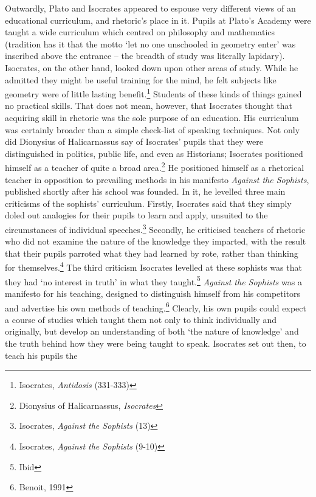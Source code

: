 \begin{multicols}{2}
Outwardly, Plato and Isocrates appeared to espouse very different views
of an educational curriculum, and rhetoric's place in it. Pupils at
Plato's Academy were taught a wide curriculum which centred on
philosophy and mathematics (tradition has it that the motto `let no one
unschooled in geometry enter' was inscribed above the entrance -- the
breadth of study was literally lapidary). Isocrates, on the other hand,
looked down upon other areas of study. While he admitted they might be
useful training for the mind, he felt subjects like geometry were of
little lasting benefit.\footnote{\textsuperscript{} Isocrates,
	\emph{Antidosis} (331-333)} Students of these kinds of things gained
no practical skills. That does not mean, however, that Isocrates thought
that acquiring skill in rhetoric was the sole purpose of an education.
His curriculum was certainly broader than a simple check-list of
speaking techniques. Not only did Dionysius of Halicarnassus say of
Isocrates' pupils that they were distinguished in politics, public life,
and even as Historians; Isocrates positioned himself as a teacher of
quite a broad area.\footnote{\textsuperscript{} Dionysius of
	Halicarnassus, \emph{Isocrates}} He positioned himself as a rhetorical
teacher in opposition to prevailing methods in his manifesto
\emph{Against the Sophists}, published shortly after his school was
founded. In it, he levelled three main criticisms of the sophists'
curriculum. Firstly, Isocrates said that they simply doled out analogies
for their pupils to learn and apply, unsuited to the circumstances of
individual speeches.\footnote{\textsuperscript{} Isocrates,
	\emph{Against the Sophists }(13)} Secondly, he criticised teachers of
rhetoric who did not examine the nature of the knowledge they imparted,
with the result that their pupils parroted what they had learned by
rote, rather than thinking for themselves.\footnote{\textsuperscript{}
	Isocrates, \emph{Against the Sophists }(9-10)} The third criticism
Isocrates levelled at these sophists was that they had `no interest in
truth' in what they taught.\footnote{\textsuperscript{} Ibid}
\emph{Against the Sophists} was a manifesto for his teaching, designed
to distinguish himself from his competitors and advertise his own
methods of teaching.\footnote{\textsuperscript{} Benoit, 1991} Clearly,
his own pupils could expect a course of studies which taught them not
only to think individually and originally, but develop an understanding
of both `the nature of knowledge' and the truth behind how they were
being taught to speak. Isocrates set out then, to teach his pupils the

\end{multicols}
